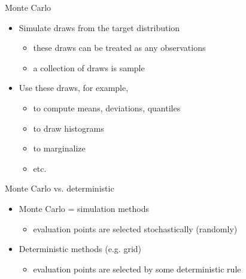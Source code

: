 \documentclass[finnish,english,t]{beamer}
\begin{document}

\begin{frame}
  
  {\Large\color{navyblue} Monte Carlo}

  \begin{itemize}
  \item Simulate draws from the target distribution
    \begin{itemize}
    \item these draws can be treated as any observations
    \item a collection of draws is sample
    \end{itemize}
  \item Use these draws, for example,
    \begin{itemize}
    \item to compute means, deviations, quantiles
    \item to draw histograms
    \item to marginalize
    \item etc.
    \end{itemize}
  \end{itemize}

\end{frame}

\begin{frame}

  
  {\Large\color{navyblue} Monte Carlo vs. deterministic}

  \begin{itemize}
  \item Monte Carlo = simulation methods
    \begin{itemize}
    \item evaluation points are selected stochastically (randomly)
    \end{itemize}
  \item Deterministic methods (e.g. grid)
    \begin{itemize}
    \item evaluation points are selected by some deterministic rule
    \end{itemize}
  \end{itemize}

\end{frame}
\end{document}
